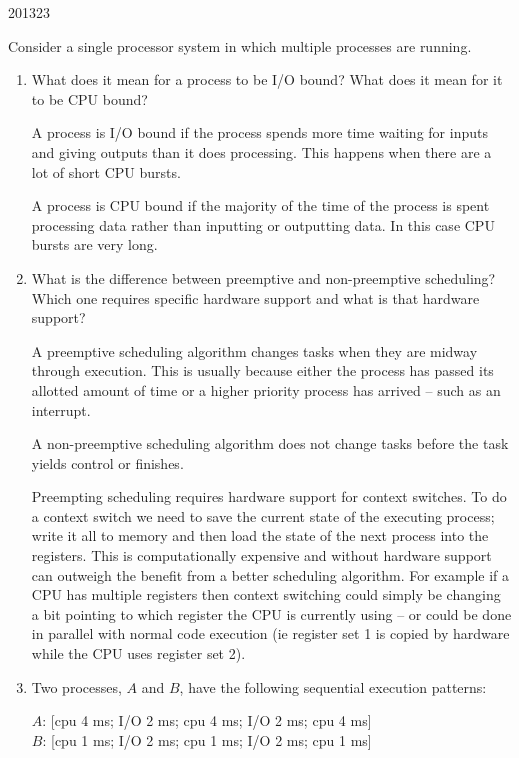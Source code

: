 \documentclass[10pt,\jkfside,a4paper]{article}
\begin{document}
\begin{examquestion}{2013}{2}{3}

Consider a single processor system in which multiple processes are running.

\begin{enumerate}

\item What does it mean for a process to be I/O bound? What does it mean for it to be CPU bound?

A process is I/O bound if the process spends more time waiting for inputs and giving outputs than it 
does processing. This happens when there are a lot of short CPU bursts.

A process is CPU bound if the majority of the time of the process is spent processing data 
rather than inputting or outputting data. In this case CPU bursts are very long.

\item What is the difference between preemptive and non-preemptive scheduling? Which one requires 
specific hardware support and what is that hardware support?

A preemptive scheduling algorithm changes tasks when they are midway through execution. This is usually 
because either the process has passed its allotted amount of time or a higher priority process has arrived -- 
such as an interrupt.

A non-preemptive scheduling algorithm does not change tasks before the task yields control or finishes. 

Preempting scheduling requires hardware support for context switches. To do a context switch we need 
to save the current state of the executing process; write it all to memory and then load the state of 
the next process into the registers. This is computationally expensive and without hardware support 
can outweigh the benefit from a better scheduling algorithm. For example if a CPU has multiple 
registers then context switching could simply be changing a bit pointing to which register the 
CPU is currently using -- or could be done in parallel with normal code execution (ie register set 1 is 
copied by hardware while the CPU uses register set 2).

\item Two processes, $A$ and $B$, have the following sequential execution patterns:

$A$: [cpu 4 ms; I/O 2 ms; cpu 4 ms; I/O 2 ms; cpu 4 ms]\\
$B$: [cpu 1 ms; I/O 2 ms; cpu 1 ms; I/O 2 ms; cpu 1 ms]\\


\end{enumerate}
\end{examquestion}
\end{document}
